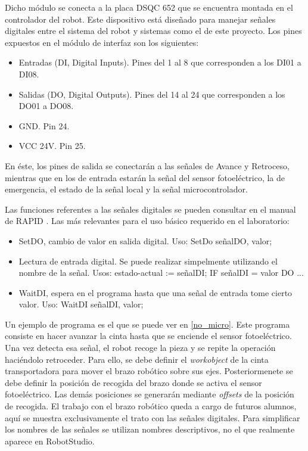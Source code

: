 Dicho módulo se conecta a la placa DSQC 652 que se encuentra montada en el controlador del robot.
Este dispositivo está diseñado para manejar señales digitales entre el sistema del robot y sistemas
como el de este proyecto. Los pines expuestos en el módulo de interfaz son los siguientes:
\begin{itemize}
    \item Entradas (DI, Digital Inputs). Pines del 1 al 8 que corresponden a los DI01 a DI08.
    \item Salidas (DO, Digital Outputs). Pines del 14 al 24 que corresponden a los DO01 a DO08.
    \item GND. Pin 24.
    \item VCC 24V. Pin 25.
\end{itemize}

En éste, los pines de salida se conectarán a las señales de Avance y Retroceso, mientras que en los
de entrada estarán la señal del sensor fotoeléctrico, la de emergencia, el estado de la señal local y
la señal microcontrolador.

Las funciones referentes a las señales digitales se pueden consultar en el manual de RAPID \cite{rapid}.
Las más relevantes para el uso básico requerido en el laboratorio:
\begin{itemize}
    \item SetDO, cambio de valor en salida digital. Uso: SetDo señalDO, valor;
    \item Lectura de entrada digital. Se puede realizar simpelmente utilizando el nombre de la señal. 
    Usos: estado-actual := señalDI; IF señalDI = valor DO ...
    \item WaitDI, espera en el programa hasta que una señal de entrada tome cierto valor.
    Uso: WaitDI señalDI, valor;
\end{itemize}

Un ejemplo de programa es el que se puede ver en \ref{no_micro}. Este programa consiste en hacer avanzar
la cinta hasta que se enciende el sensor fotoeléctrico.
Una vez detecta esa señal, el robot recoge la pieza y se repite la operación 
haciéndolo retroceder. Para ello, se debe definir el \textit{workobject} de la cinta transportadora para mover
el brazo robótico sobre sus ejes. Posteriormenete se debe definir la posición de recogida del brazo donde 
se activa el sensor fotoeléctrico. Las demás posiciones se generarán mediante \emph{offsets} de la posición de recogida.
El trabajo con el brazo robótico queda a cargo de futuros alumnos, aquí se muestra exclusivamente el trato 
con las señales digitales. Para simplificar los nombres de las señales se utilizan nombres descriptivos, no
el que realmente aparece en RobotStudio.

